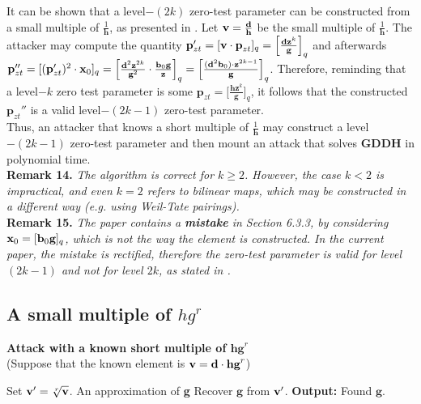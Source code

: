 It can be shown that a level$-(2k)$ zero-test parameter can be constructed from a small multiple of $\frac{1}{\textbf{h}}$, as presented in \cite{GGH13}. Let $\textbf{v} = \frac{\textbf{d}}{\textbf{h}}$ be the small multiple of $\frac{1}{\textbf{h}}$. The attacker may compute the quantity $\textbf{p}_{zt}' = [\textbf{v} \cdot \textbf{p}_{zt}]_q = \Big[\frac{\textbf{d}\textbf{z}^k}{\textbf{g}} \Big]_q$ and afterwards $\textbf{p}_{zt}'' = [(\textbf{p}_{zt}')^2 \cdot \textbf{x}_0]_q = \Big[\frac{\textbf{d}^2 \textbf{z}^{2k}}{\textbf{g}^2} \cdot \frac{\textbf{b}_0 \textbf{g}}{\textbf{z}} \Big]_q = \Big[ \frac{(\textbf{d}^2\textbf{b}_0) \cdot \textbf{z}^{2k-1}}{\textbf{g}} \Big]_q$. Therefore, reminding that a level$-k$ zero test parameter is some $\textbf{p}_{zt} = \Big[ \frac{\textbf{hz}^k}{\textbf{g}} \Big]_q$, it follows that the constructed $\textbf{p}_{zt}''$ is a valid level$-(2k-1)$ zero-test parameter.\\

Thus, an attacker that knows a short multiple of $\frac{1}{\textbf{h}}$ may construct a level$-(2k-1)$ zero-test parameter and then mount an attack that solves \textbf{GDDH} in polynomial time.\\

\textbf{Remark 14.} \textit{The algorithm is correct for $k \geq 2$. However, the case $k < 2$ is impractical, and even $k = 2$ refers to bilinear maps, which may be constructed in a different way (e.g. using Weil-Tate pairings).}\\

\textbf{Remark 15.} \textit{The paper \cite{GGH13} contains a \textbf{mistake} in Section 6.3.3, by considering $\textbf{x}_0 = [\textbf{b}_0 \textbf{g}]_q$, which is not the way the element is constructed. In the current paper, the mistake is rectified, therefore the zero-test parameter is valid for level $(2k-1)$ and not for level $2k$, as stated in \cite{GGH13}.}

\subsection{A small multiple of $hg^r$}

\begin{tcolorbox}[colframe=black,colback=white,arc=0pt,outer arc=0pt]
	\begin{center}
		\textbf{Attack with a known short multiple of $\textbf{hg}^r$}\\
		(Suppose that the known element is $\textbf{v} = \textbf{d} \cdot \textbf{hg}^r$)
	\end{center}
	\begin{algorithmic}[1]
		\State Set $\textbf{v}' = \sqrt[r]{\textbf{v}}$. \Comment An approximation of \textbf{g}
		\Statex
		\State Recover $\textbf{g}$ from $\textbf{v}'$.
		\Statex
		\State \textbf{Output:} Found $\textbf{g}$.
	\end{algorithmic}
\end{tcolorbox}
~\\

